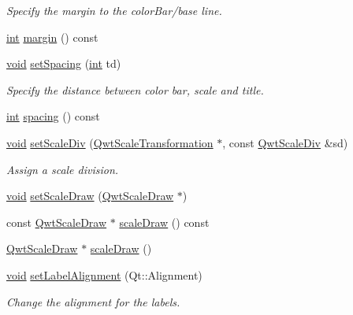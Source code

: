 \begin{DoxyCompactItemize}
\begin{DoxyCompactList}\small\item\em Specify the margin to the color\-Bar/base line. \end{DoxyCompactList}\item 
\hyperlink{ioapi_8h_a787fa3cf048117ba7123753c1e74fcd6}{int} \hyperlink{class_qwt_scale_widget_a4827906c3f11825d479c6e493c8e1b4c}{margin} () const 
\item 
\hyperlink{group___u_a_v_objects_plugin_ga444cf2ff3f0ecbe028adce838d373f5c}{void} \hyperlink{class_qwt_scale_widget_aaaad9f3d54fd329b16b738ca2df00ddf}{set\-Spacing} (\hyperlink{ioapi_8h_a787fa3cf048117ba7123753c1e74fcd6}{int} td)
\begin{DoxyCompactList}\small\item\em Specify the distance between color bar, scale and title. \end{DoxyCompactList}\item 
\hyperlink{ioapi_8h_a787fa3cf048117ba7123753c1e74fcd6}{int} \hyperlink{class_qwt_scale_widget_a1bdb5b6fa77a4535087f1c672ee394ce}{spacing} () const 
\item 
\hyperlink{group___u_a_v_objects_plugin_ga444cf2ff3f0ecbe028adce838d373f5c}{void} \hyperlink{class_qwt_scale_widget_ad2d2f5a313d4b18499416b03613efef8}{set\-Scale\-Div} (\hyperlink{class_qwt_scale_transformation}{Qwt\-Scale\-Transformation} $\ast$, const \hyperlink{class_qwt_scale_div}{Qwt\-Scale\-Div} \&sd)
\begin{DoxyCompactList}\small\item\em Assign a scale division. \end{DoxyCompactList}\item 
\hyperlink{group___u_a_v_objects_plugin_ga444cf2ff3f0ecbe028adce838d373f5c}{void} \hyperlink{class_qwt_scale_widget_af93459026340638898c11a799f4ae0c0}{set\-Scale\-Draw} (\hyperlink{class_qwt_scale_draw}{Qwt\-Scale\-Draw} $\ast$)
\item 
const \hyperlink{class_qwt_scale_draw}{Qwt\-Scale\-Draw} $\ast$ \hyperlink{class_qwt_scale_widget_ad8603e84f851e5d91feb21beebf19896}{scale\-Draw} () const 
\item 
\hyperlink{class_qwt_scale_draw}{Qwt\-Scale\-Draw} $\ast$ \hyperlink{class_qwt_scale_widget_a6ccb7e3a4537396f59fc30c7d76cc20d}{scale\-Draw} ()
\item 
\hyperlink{group___u_a_v_objects_plugin_ga444cf2ff3f0ecbe028adce838d373f5c}{void} \hyperlink{class_qwt_scale_widget_a8d16473c34f8eaea7e6c457a4de25949}{set\-Label\-Alignment} (Qt\-::\-Alignment)
\begin{DoxyCompactList}\small\item\em Change the alignment for the labels. \end{DoxyCompactList}\item 

\end{DoxyCompactItemize}
